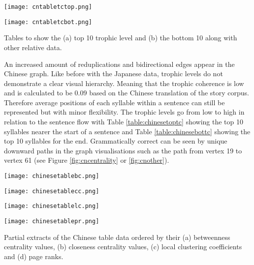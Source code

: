 \begin{table}[!htb]
\centering
\begin{subtable}{.45\textwidth}
	\centering
	\texttt{[image: cntabletctop.png]}
	\caption{}
	\label{table:chinesetoptc}
\end{subtable}
\hfill
\begin{subtable}{.45\textwidth}
	\centering
	\texttt{[image: cntabletcbot.png]}
	\caption{}
	\label{table:chinesebottc}
\end{subtable}
\caption{Tables to show the (a) top 10 trophic level and (b) the bottom 10 along with other relative data.}
\end{table}

An increased amount of reduplications and bidirectional edges appear in the Chinese graph. Like before with the Japanese data, trophic levels do not demonstrate a clear visual hierarchy. Meaning that the trophic coherence is low and is calculated to be $0.09$ based on the Chinese translation of the story corpus. Therefore average positions of each syllable within a sentence can still be represented but with minor flexibility. The trophic levels go from low to high in relation to the sentence flow with Table \ref{table:chinesetoptc} showing the top 10 syllables nearer the start of a sentence and Table \ref{table:chinesebottc} showing the top 10 syllables for the end. Grammatically correct can be seen by unique downward paths in the graph visualisations such as the path from vertex 19 to vertex 61 (see Figure \ref{fig:cncentrality} or \ref{fig:cnother}).

\begin{table}[!htb]
\centering
\begin{subtable}{.2\textwidth}
	\centering
	\texttt{[image: chinesetablebc.png]}
	\caption{}
	\label{table:chinesetablebc}
\end{subtable}
\hfill
\begin{subtable}{.2\textwidth}
	\centering
	\texttt{[image: chinesetablecc.png]}
	\caption{}
	\label{table:chinesetablecc}
\end{subtable}
\hfill
\begin{subtable}{.2\textwidth}
	\centering
	\texttt{[image: chinesetablelc.png]}
	\caption{}
	\label{table:chinesetablelc}
\end{subtable}
\hfill
\begin{subtable}{.2\textwidth}
	\centering
	\texttt{[image: chinesetablepr.png]}
	\caption{}
	\label{table:chinesetablepr}
\end{subtable}
\caption{Partial extracts of the Chinese table data ordered by their (a) betweenness centrality values, (b) closeness centrality values, (c) local clustering coefficients and (d) page ranks.}
\end{table}


